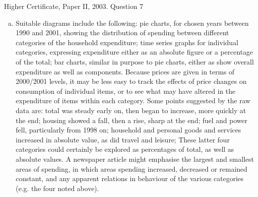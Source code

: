 \documentclass[a4paper,12pt]{article}
\begin{document}
Higher Certificate, Paper II, 2003. Question 7
\begin{enumerate}[(a)]
\item Suitable diagrams include the following:
pie charts, for chosen years between 1990 and 2001, showing the distribution
of spending between different categories of the household expenditure;
time series graphs for individual categories, expressing expenditure either as
an absolute figure or a percentage of the total;
bar charts, similar in purpose to pie charts, either as %
show overall expenditure as well as components.
Because prices are given in terms of 2000/2001 levels, it may be less easy to track the
effects of price changes on consumption of individual items, or to see what may have
altered in the expenditure of items within each category.
Some points suggested by the raw data are:
total was steady early on, then began to increase, more quickly at the end;
housing showed a fall, then a rise, sharp at the end;
fuel and power fell, particularly from 1998 on;
household and personal goods and services increased in absolute value, as did
travel and leisure;
These latter four categories could certainly be explored as percentages of total, as well
as absolute values.
A newspaper article might emphasise the largest and smallest areas of spending, in
which areas spending increased, decreased or remained constant, and any apparent
relations in behaviour of the various categories (e.g. the four noted above).
\end{enumerate}
\end{document}
